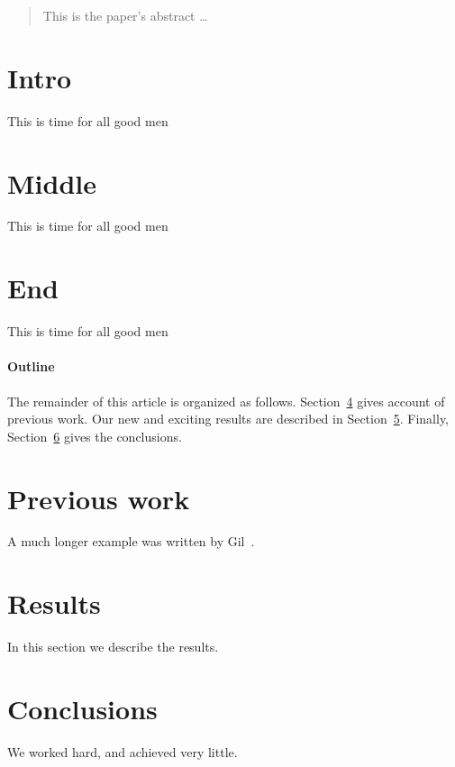 \documentclass[12pt]{article}
\begin{document}
\maketitle

\begin{abstract}
This is the paper's abstract \ldots
\end{abstract}

\begin{minipage}[c]{0.33\textwidth}
  \section{Intro}
  This is time for all good men
\end{minipage}
\begin{minipage}[c]{0.33\textwidth}
  \section{Middle}
  This is time for all good men
\end{minipage}
\begin{minipage}[c]{0.33\textwidth}
  \section{End}
  This is time for all good men
\end{minipage}

\paragraph{Outline}
The remainder of this article is organized as follows.
Section~\ref{previous work} gives account of previous work.
Our new and exciting results are described in Section~\ref{results}.
Finally, Section~\ref{conclusions} gives the conclusions.

\section{Previous work}\label{previous work}
A much longer \LaTeXe{} example was written by Gil~\cite{Gil:02}.

\section{Results}\label{results}
In this section we describe the results.

\section{Conclusions}\label{conclusions}
We worked hard, and achieved very little.



\end{document}

